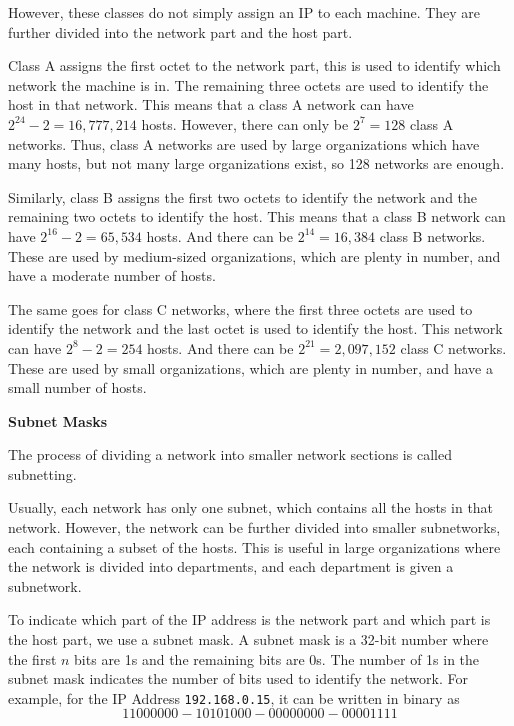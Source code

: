However, these classes do not simply assign an IP to
each machine. They are further divided into the
network part and the host part.

Class A assigns the first octet to the network part,
this is used to identify which network the machine
is in. The remaining three octets are used to identify
the host in that network. This means that a class A
network can have $2^{24} - 2 = 16,777,214$ hosts.
However, there can only be $2^{7} = 128$ class A
networks. Thus, class A networks are used by large
organizations which have many hosts, but not many
large organizations exist, so 128 networks are enough.

Similarly, class B assigns the first two octets to
identify the network and the remaining two octets
to identify the host. This means that a class B
network can have $2^{16} - 2 = 65,534$ hosts.
And there can be $2^{14} = 16,384$ class B networks.
These are used by medium-sized organizations, which
are plenty in number, and have a moderate number of
hosts.

The same goes for class C networks, where the first
three octets are used to identify the network and
the last octet is used to identify the host. This
network can have $2^{8} - 2 = 254$ hosts. And there
can be $2^{21} = 2,097,152$ class C networks. These
are used by small organizations, which are plenty
in number, and have a small number of hosts.

\textbf{Subnet Masks}

\begin{definition}[Subnetting]
The process of dividing a network into smaller network
sections is called subnetting.
\end{definition}

Usually, each network has only one subnet, which
contains all the hosts in that network. However,
the network can be further divided into smaller
subnetworks, each containing a subset of the hosts.
This is useful in large organizations where the
network is divided into departments, and each
department is given a subnetwork.

To indicate which part of the IP address is the
network part and which part is the host part, we
use a subnet mask. A subnet mask is a 32-bit
number where the first $n$ bits are 1s and the
remaining bits are 0s. The number of 1s in the
subnet mask indicates the number of bits used
to identify the network. For example, for the
IP Address \lstinline|192.168.0.15|, it can be
written in binary as
\[
1100 0000 - 1010 1000 - 0000 0000 - 0000 1111
\]


